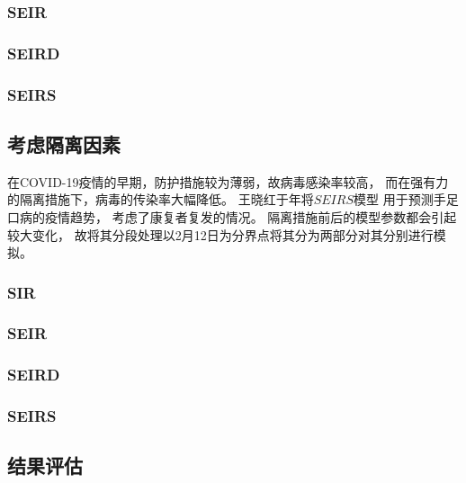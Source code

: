 \subsubsection{SEIR}
\subsubsection{SEIRD}
\subsubsection{SEIRS}
\subsection{考虑隔离因素}
在COVID-19疫情的早期，防护措施较为薄弱，故病毒感染率较高，
而在强有力的隔离措施下，病毒的传染率大幅降低。
王晓红于\citeyear{一类具有潜伏期的SEIR手足口病模型的研究}年将$SEIRS$模型
用于预测手足口病的疫情趋势\cite{一类具有潜伏期的SEIR手足口病模型的研究}，
考虑了康复者复发的情况。
隔离措施前后的模型参数都会引起较大变化，
故将其分段处理以2月12日为分界点将其分为两部分对其分别进行模拟。
\subsubsection{SIR}
\subsubsection{SEIR}
\subsubsection{SEIRD}
\subsubsection{SEIRS}
\subsection{结果评估}